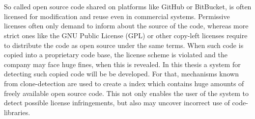 \chapter{\abstractname}

So called open source code shared on platforms like GitHub or BitBucket, is often licensed for modification and reuse even in commercial systems.
Permissive licenses often only demand to inform about the source of the code, whereas more strict ones like the GNU Public License (GPL) or other copy-left licenses require to distribute the code as open source under the same terms.
When such code is copied into a proprietary code base, the license scheme is violated and the company may face huge fines, when this is revealed.
In this thesis a system for detecting such copied code will be be developed.
For that, mechanisms known from clone-detection are used to create a index which contains huge amounts of freely available open source code.
This not only enables the user of the system to detect possible license infringements, but also may uncover incorrect use of code-libraries.